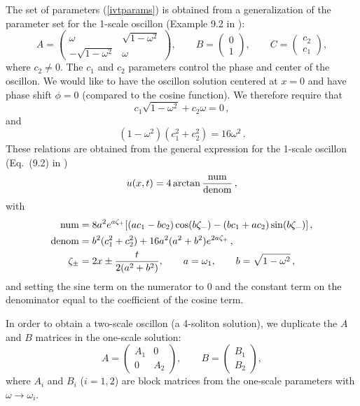 \documentclass[11pt]{book}
\begin{document}
The set of parameters (\ref{ivtparams}) is obtained from a generalization of the parameter set for the 1-scale oscillon (Example 9.2 in \cite{:/content/aip/journal/jmp/51/12/10.1063/1.3520596}):
\begin{equation}
  A = \left(\begin{array}{cc}
    \omega & \sqrt{1-\omega^2}\\
    -\sqrt{1-\omega^2}&\omega
  \end{array}\right),
  \qquad B = \left(\begin{array}{c}
    0\\
    1
  \end{array}\right),
  \qquad C = \left(\begin{array}{c}
    c_2\\
    c_1
  \end{array}\right),
\end{equation}
where $c_2\neq0$. The $c_1$ and $c_2$ parameters control the phase and center of the oscillon. We would like to have the oscillon solution centered at $x=0$ and have phase shift $\phi=0$ (compared to the cosine function). We therefore require that
\begin{equation}
  c_1 \sqrt{1-\omega^2} + c_2\omega = 0\,,
\end{equation}
and
\begin{equation}
  (1-\omega^2)(c_1^2+ c_2^2) = 16\omega^2\,.
\end{equation}
These relations are obtained from the general expression for the 1-scale oscillon (Eq.~(9.2) in \cite{:/content/aip/journal/jmp/51/12/10.1063/1.3520596})
\begin{equation}
  u(x,t) = 4\arctan\frac{\rm num}{\rm denom}\,,
\end{equation}
with
\begin{subequations}
  \begin{align}
  {\rm num} &= 8a^2e^{a\zeta_+}[(ac_1-bc_2)\cos(b\zeta_-)-(bc_1+ac_2)\sin(b\zeta_-)]\,,\\
  {\rm denom} &= b^2 (c_1^2+c_2^2) + 16 a^2 (a^2+b^2)e^{2a\zeta_+}\,,\\
  \zeta_{\pm}&=2x\pm\frac{t}{2(a^2+b^2)},\qquad  a=\omega_1,\qquad b=\sqrt{1-\omega^2}\,,
  \end{align}
\end{subequations}
and setting the sine term on the numerator to 0 and the constant term on the denominator equal to the coefficient of the cosine term.

In order to obtain a two-scale oscillon (a 4-soliton solution), we duplicate the $A$ and $B$ matrices in the one-scale solution:
\begin{equation}
  A = \left(\begin{array}{cc}
    A_1 & 0\\
    0 & A_2
  \end{array}\right),
  \qquad B = \left(\begin{array}{c}
    B_1\\
    B_2
  \end{array}\right),
\end{equation}
where $A_i$ and $B_i$ ($i=1,2$) are block matrices from the one-scale parameters with $\omega\to\omega_i$.
\end{document}

